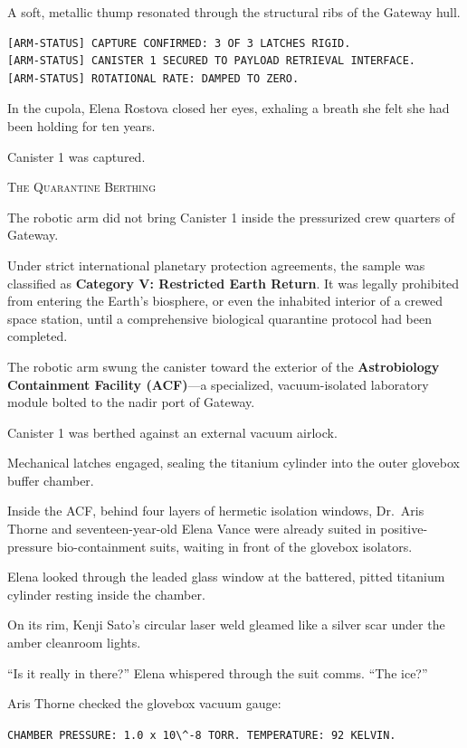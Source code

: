 \documentclass[12pt,twoside,openright]{book}
\newcommand{\sceneheader}[1]{%
  \par\vspace{1.8em}%
  {\noindent\centering\scshape\large #1\par}%
  \vspace{1.0em}%
  \noindent%
}
\newcommand{\dinkus}{%
  \par\vspace{1.2em}%
  {\noindent\centering{\large $\ast\quad\ast\quad\ast$}\par}%
  \vspace{1.2em}%
  \noindent%
}
\begin{document}
A soft, metallic thump resonated through the structural ribs of the
Gateway hull.

\begin{lstlisting}
[ARM-STATUS] CAPTURE CONFIRMED: 3 OF 3 LATCHES RIGID.
[ARM-STATUS] CANISTER 1 SECURED TO PAYLOAD RETRIEVAL INTERFACE.
[ARM-STATUS] ROTATIONAL RATE: DAMPED TO ZERO.
\end{lstlisting}

In the cupola, Elena Rostova closed her eyes, exhaling a breath she felt
she had been holding for ten years.

Canister 1 was captured.

\dinkus

\sceneheader{The Quarantine Berthing}

The robotic arm did not bring Canister 1 inside the pressurized crew
quarters of Gateway.

Under strict international planetary protection agreements, the sample
was classified as \textbf{Category V: Restricted Earth Return}. It was
legally prohibited from entering the Earth's biosphere, or even the
inhabited interior of a crewed space station, until a comprehensive
biological quarantine protocol had been completed.

The robotic arm swung the canister toward the exterior of the
\textbf{Astrobiology Containment Facility (ACF)}---a specialized,
vacuum-isolated laboratory module bolted to the nadir port of Gateway.

Canister 1 was berthed against an external vacuum airlock.

Mechanical latches engaged, sealing the titanium cylinder into the outer
glovebox buffer chamber.

Inside the ACF, behind four layers of hermetic isolation windows,
Dr.~Aris Thorne and seventeen-year-old Elena Vance were already suited
in positive-pressure bio-containment suits, waiting in front of the
glovebox isolators.

Elena looked through the leaded glass window at the battered, pitted
titanium cylinder resting inside the chamber.

On its rim, Kenji Sato's circular laser weld gleamed like a silver scar
under the amber cleanroom lights.

``Is it really in there?'' Elena whispered through the suit comms. ``The
ice?''

Aris Thorne checked the glovebox vacuum gauge:

\passthrough{\lstinline!CHAMBER PRESSURE: 1.0 x 10\^-8 TORR. TEMPERATURE: 92 KELVIN.!}
\end{document}
